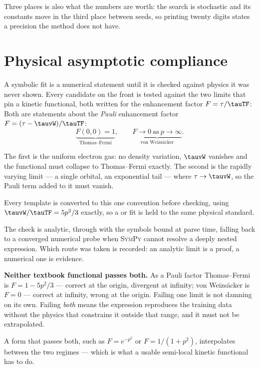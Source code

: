 Three places is also what the numbers are worth: the search is stochastic and
its constants move in the third place between seeds, so printing twenty digits
states a precision the method does not have.

\section{Physical asymptotic compliance}
\label{sec:symbolic-limits}

A symbolic fit is a numerical statement until it is checked against physics it
was never shown. Every candidate on the front is tested against the two limits
that pin a kinetic functional, both written for the enhancement factor
$F = \tau/\tauTF$:
%
Both are statements about the \emph{Pauli} enhancement factor
$F = (\tau - \tauvW)/\tauTF$:
%
\begin{equation}
  \underbrace{F(0,0) = 1}_{\text{Thomas--Fermi}},
  \qquad
  \underbrace{F \to 0 \ \text{as}\ p \to \infty}_{\text{von Weizs\"acker}}.
\end{equation}

The first is the uniform electron gas: no density variation, $\tauvW$ vanishes
and the functional must collapse to Thomas--Fermi exactly. The second is the
rapidly varying limit --- a single orbital, an exponential tail --- where
$\tau \to \tauvW$, so the Pauli term added to it must vanish.

Every template is converted to this one convention before checking, using
$\tauvW/\tauTF = 5p^2/3$ exactly, so a  or  fit is
held to the same physical standard.

The check is analytic, through  with the symbols bound at
parse time, falling back to a converged numerical probe when \textsc{SymPy}
cannot resolve a deeply nested expression. Which route was taken is recorded:
an analytic limit is a proof, a numerical one is evidence.

\begin{pwarn}
\textbf{Neither textbook functional passes both.} As a Pauli factor
Thomas--Fermi is $F = 1 - 5p^2/3$ --- correct at the origin, divergent at
infinity; von Weizs\"acker is $F = 0$ --- correct at infinity, wrong at the
origin. Failing one limit is not damning on its own. Failing \emph{both} means
the expression reproduces the training data without the physics that constrains
it outside that range, and it must not be extrapolated.

A form that passes both, such as $F = e^{-p^2}$ or $F = 1/(1+p^2)$,
interpolates between the two regimes --- which is what a usable semi-local
kinetic functional has to do.
\end{pwarn}

